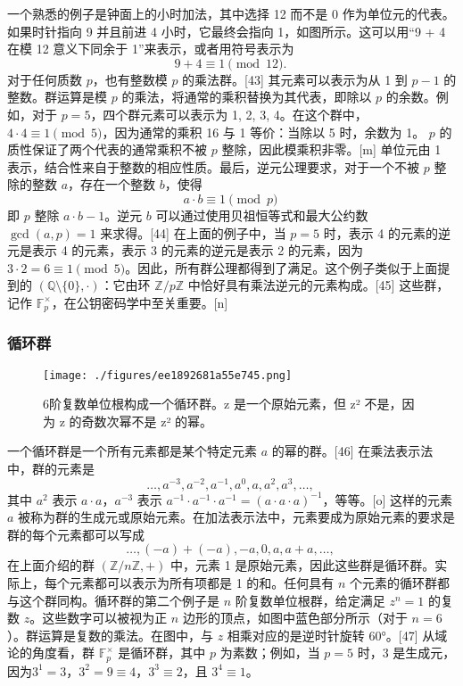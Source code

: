 一个熟悉的例子是钟面上的小时加法，其中选择 12 而不是 0 作为单位元的代表。如果时针指向 9 并且前进 4 小时，它最终会指向 1，如图所示。这可以用“9 + 4 在模 12 意义下同余于 1”来表示，或者用符号表示为  
\[
9 + 4 \equiv 1 \pmod{12}.~
\]
对于任何质数 \( p \)，也有整数模 \( p \) 的乘法群。[43] 其元素可以表示为从 1 到 \( p - 1 \) 的整数。群运算是模 \( p \) 的乘法，将通常的乘积替换为其代表，即除以 \( p \) 的余数。例如，对于 \( p = 5 \)，四个群元素可以表示为 1, 2, 3, 4。在这个群中，\( 4 \cdot 4 \equiv 1 \pmod{5} \)，因为通常的乘积 16 与 1 等价：当除以 5 时，余数为 1。 \( p \) 的质性保证了两个代表的通常乘积不被 \( p \) 整除，因此模乘积非零。[m] 单位元由 1 表示，结合性来自于整数的相应性质。最后，逆元公理要求，对于一个不被 \( p \) 整除的整数 \( a \)，存在一个整数 \( b \)，使得  
\[
a \cdot b \equiv 1 \pmod{p}~
\]
即 \( p \) 整除 \( a \cdot b - 1 \)。逆元 \( b \) 可以通过使用贝祖恒等式和最大公约数 \( \gcd(a, p) = 1 \) 来求得。[44] 在上面的例子中，当 \( p = 5 \) 时，表示 4 的元素的逆元是表示 4 的元素，表示 3 的元素的逆元是表示 2 的元素，因为 \( 3 \cdot 2 = 6 \equiv 1 \pmod{5} \)。因此，所有群公理都得到了满足。这个例子类似于上面提到的 \( (\mathbb{Q} \setminus \{0\}, \cdot) \)：它由环 \( \mathbb{Z}/p\mathbb{Z} \) 中恰好具有乘法逆元的元素构成。[45] 这些群，记作 \( \mathbb{F}_p^\times \)，在公钥密码学中至关重要。[n]
\subsubsection{循环群}
\begin{figure}[ht]
\centering
\texttt{[image: ./figures/ee1892681a55e745.png]}
\caption{6阶复数单位根构成一个循环群。z 是一个原始元素，但 z² 不是，因为 z 的奇数次幂不是 z² 的幂。} \label{fig_GroupM_6}
\end{figure}
一个循环群是一个所有元素都是某个特定元素 \(a\) 的幂的群。[46] 在乘法表示法中，群的元素是  
\[\dots, a^{-3}, a^{-2}, a^{-1}, a^{0}, a, a^2, a^3, \dots,~\]
其中 \(a^2\) 表示 \(a \cdot a\)，\(a^{-3}\) 表示 \(a^{-1} \cdot a^{-1} \cdot a^{-1} = (a \cdot a \cdot a)^{-1}\)，等等。[o] 这样的元素 \(a\) 被称为群的生成元或原始元素。在加法表示法中，元素要成为原始元素的要求是群的每个元素都可以写成  
\[\dots, (-a) + (-a), -a, 0, a, a + a, \dots,~\]
在上面介绍的群 \((\mathbb{Z}/n\mathbb{Z}, +)\) 中，元素 1 是原始元素，因此这些群是循环群。实际上，每个元素都可以表示为所有项都是 1 的和。任何具有 \(n\) 个元素的循环群都与这个群同构。循环群的第二个例子是 \(n\) 阶复数单位根群，给定满足 \(z^n = 1\) 的复数 \(z\)。这些数字可以被视为正 \(n\) 边形的顶点，如图中蓝色部分所示（对于 \(n = 6\)）。群运算是复数的乘法。在图中，与 \(z\) 相乘对应的是逆时针旋转 60°。[47] 从域论的角度看，群 \(\mathbb{F}_p^\times\) 是循环群，其中 \(p\) 为素数；例如，当 \(p = 5\) 时，3 是生成元，因为\(3^1 = 3\)，\(3^2 = 9 \equiv 4\)，\(3^3 \equiv 2\)，且 \(3^4 \equiv 1\)。

